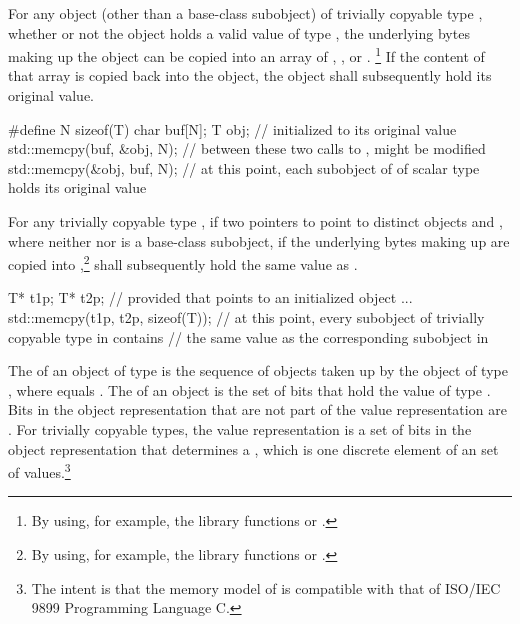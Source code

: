 \pnum
{}%
%
For any object (other than a base-class subobject) of trivially copyable type
, whether or not the object holds a valid value of type
, the underlying bytes making up the
object can be copied into an array of
,
, or
.%
\footnote{By using, for example, the library
functions  or .}
If the content of that array
is copied back into the object, the object shall
subsequently hold its original value. \begin{example}
\begin{codeblock}
#define N sizeof(T)
char buf[N];
T obj;                          //  initialized to its original value
std::memcpy(buf, &obj, N);      // between these two calls to ,  might be modified
std::memcpy(&obj, buf, N);      // at this point, each subobject of  of scalar type holds its original value
\end{codeblock}
\end{example}

\pnum
For any trivially copyable type , if two pointers to  point to
distinct  objects  and , where neither
 nor  is a base-class subobject, if the underlying
bytes making up
 are copied into ,\footnote{By using, for example,
the library functions  or .}
  shall subsequently hold the same value as
. \begin{example}

\begin{codeblock}
T* t1p;
T* t2p;
    // provided that  points to an initialized object ...
std::memcpy(t1p, t2p, sizeof(T));
    // at this point, every subobject of trivially copyable type in  contains
    // the same value as the corresponding subobject in 
\end{codeblock}
\end{example}%

\pnum
The 
%
of an object of type  is the
sequence of   objects taken up
by the object of type , where  equals
. The
%
of an object is the set of bits that hold
the value of type .
Bits in the object representation that are not part of the value representation
are .
For trivially copyable types, the value representation is
a set of bits in the object representation that determines a
, which is one discrete element of an
 set of values.\footnote{The
intent is that the memory model of \Cpp{} is compatible
with that of ISO/IEC 9899 Programming Language C.}


